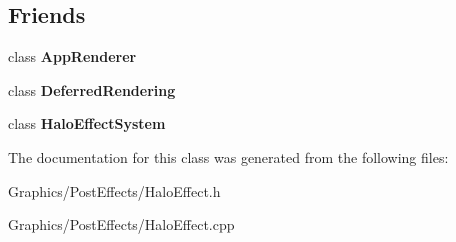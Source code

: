 \subsection*{Friends}
\begin{DoxyCompactItemize}
\item 
\mbox{\label{classHaloEffect_a5f3d064e51c4a3bf9409801632b9a7af}} 
class {\bfseries App\+Renderer}
\item 
\mbox{\label{classHaloEffect_a355bf32616f2e1751ee46bd315e905e5}} 
class {\bfseries Deferred\+Rendering}
\item 
\mbox{\label{classHaloEffect_a48ea1f3f3b0f91b58f6ccda709a96f69}} 
class {\bfseries Halo\+Effect\+System}
\end{DoxyCompactItemize}


The documentation for this class was generated from the following files\+:\begin{DoxyCompactItemize}
\item 
Graphics/\+Post\+Effects/Halo\+Effect.\+h\item 
Graphics/\+Post\+Effects/Halo\+Effect.\+cpp\end{DoxyCompactItemize}
